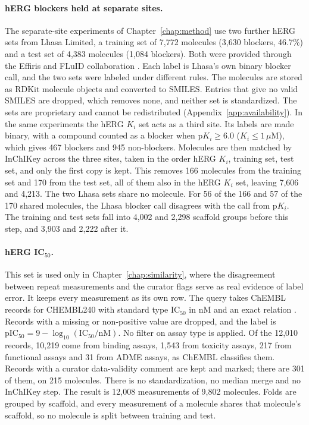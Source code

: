 \paragraph{hERG blockers held at separate sites.} The separate-site experiments of Chapter~\ref{chap:method} use two further hERG sets from Lhasa Limited, a training set of 7,772 molecules (3,630 blockers, 46.7\%) and a test set of 4,383 molecules (1,084 blockers). Both were provided through the Effiris and FLuID collaboration \citep{Bassani2023, Hanser2023}. Each label is Lhasa's own binary blocker call, and the two sets were labeled under different rules. The molecules are stored as RDKit molecule objects and converted to SMILES. Entries that give no valid SMILES are dropped, which removes none, and neither set is standardized. The sets are proprietary and cannot be redistributed (Appendix~\ref{app:availability}). In the same experiments the hERG $K_i$ set acts as a third site. Its labels are made binary, with a compound counted as a blocker when $\mathrm{p}K_i \ge 6.0$ ($K_i \le 1\,\mu$M), which gives 467 blockers and 945 non-blockers. Molecules are then matched by InChIKey across the three sites, taken in the order hERG $K_i$, training set, test set, and only the first copy is kept. This removes 166 molecules from the training set and 170 from the test set, all of them also in the hERG $K_i$ set, leaving 7,606 and 4,213. The two Lhasa sets share no molecule. For 56 of the 166 and 57 of the 170 shared molecules, the Lhasa blocker call disagrees with the call from p$K_i$. The training and test sets fall into 4,002 and 2,298 scaffold groups before this step, and 3,903 and 2,222 after it.

\paragraph{\texorpdfstring{hERG IC$_{50}$.}{hERG IC50.}} This set is used only in Chapter~\ref{chap:similarity}, where the disagreement between repeat measurements and the curator flags serve as real evidence of label error. It keeps every measurement as its own row. The query takes ChEMBL records for CHEMBL240 with standard type IC$_{50}$ in nM and an exact relation \citep{Zdrazil2023}. Records with a missing or non-positive value are dropped, and the label is $\mathrm{pIC_{50}} = 9 - \log_{10}(\mathrm{IC_{50}}/\mathrm{nM})$. No filter on assay type is applied. Of the 12,010 records, 10,219 come from binding assays, 1,543 from toxicity assays, 217 from functional assays and 31 from ADME assays, as ChEMBL classifies them. Records with a curator data-validity comment are kept and marked; there are 301 of them, on 215 molecules. There is no standardization, no median merge and no InChIKey step. The result is 12,008 measurements of 9,802 molecules. Folds are grouped by scaffold, and every measurement of a molecule shares that molecule's scaffold, so no molecule is split between training and test.


